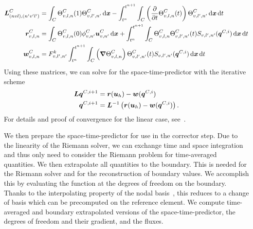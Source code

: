 \newcommand{\pleft}{\bm{L}}
\newcommand{\prightsol}{\bm{r}}
\newcommand{\prightpred}{\bm{w}}
\begin{align}
  \label{eq:predictor-matrices}
  \pleft^{\cell}_{(n v l), (n' v' l')} &=
\intdcell{
  \sttestfunction[\cell][v,l,n](1) \stbasis[\cell][v,l', n']
}
-
\intdt{\intdcell{
  \left( \pdv{}{t} \sttestfunction[\cell][v,l,n] (t) \right) \stbasis[\cell][v,l',n']
}}                             
\\
\prightsol^{\cell}_{v, l,n} &=
\intdcell{
  \sttestfunction[\cell][v,l,n] (0) \sbasis[\cell][v,n'] \dsol[v,n']^{\cell}
}
+
\intdt{\intdcell{
  \sttestfunction[\cell][v,l,n] \stbasis[\cell][v,l',n'](t) S_{v,l',n'}(\stpredictor[]^{\cell, i})
}}                             
  \\
\prightpred^{\cell}_{v,l,n} &= 
F^{k}_{v,l',n'}
\intdt{\intdcell{
  \left( \gradient{\sttestfunction[\cell][v,l,n]} \right) \stbasis[\cell][v,l',n'](t) S_{v,l',n'}(\stpredictor[]^{\cell, i})
}}
\end{align}
Using these matrices, we can solve for the space-time-predictor with the iterative scheme
\begin{align}
  \label{eq:predictor-iterative}
  \pleft \stpredictor[]^{\cell, i+1} &= \prightsol (\dsol) - \prightpred(\stpredictor[]^{\cell, i}) \\
 \stpredictor[]^{\cell, i+1} &= \pleft^{-1} \left( \prightsol (\dsol) - \prightpred(\stpredictor[]^{\cell, i}) \right).
\end{align}
For details and proof of convergence for the linear case, see~\cite{dumbser2008unified}.

We then prepare the space-time-predictor for use in the corrector step.
Due to the linearity of the Riemann solver, we can exchange time and space integration and thus only need to consider the Riemann problem for time-averaged quantities.
We then extrapolate all quantities to the boundary.
This is needed for the Riemann solver and for the reconstruction of boundary values.
We accomplish this by evaluating the function at the degrees of freedom on the boundary.
Thanks to the interpolating property of the nodal basis~, this reduces to a change of basis which can be precomputed on the reference element.
We compute time-averaged and boundary extrapolated versions of the space-time-predictor, the degrees of freedom and their gradient, and the fluxes. 

